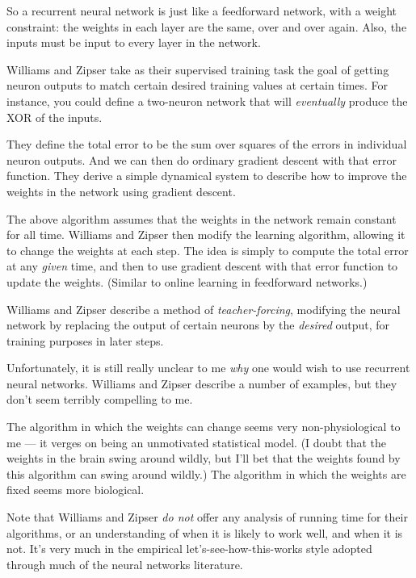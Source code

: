 \documentclass[12pt]{article}
\begin{document}
  So a recurrent neural network is just like a feedforward network,
  with a weight constraint: the weights in each layer are the same,
  over and over again.  Also, the inputs must be input to every layer
  in the network.
  
  Williams and Zipser take as their supervised training task the goal
  of getting neuron outputs to match certain desired training values
  at certain times.  For instance, you could define a two-neuron
  network that will \emph{eventually} produce the XOR of the inputs.
  
  They define the total error to be the sum over squares of the errors
  in individual neuron outputs.  And we can then do ordinary gradient
  descent with that error function.  They derive a simple dynamical
  system to describe how to improve the weights in the network using
  gradient descent.

  The above algorithm assumes that the weights in the network remain
  constant for all time.  Williams and Zipser then modify the learning
  algorithm, allowing it to change the weights at each step.  The idea
  is simply to compute the total error at any \emph{given} time, and then
  to use gradient descent with that error function to update the
  weights.  (Similar to online learning in feedforward networks.)
  
  Williams and Zipser describe a method of \emph{teacher-forcing},
  modifying the neural network by replacing the output of certain
  neurons by the \emph{desired} output, for training purposes in later
  steps.
  
  Unfortunately, it is still really unclear to me \emph{why} one would
  wish to use recurrent neural networks.  Williams and Zipser describe
  a number of examples, but they don't seem terribly compelling to me.
  
  The algorithm in which the weights can change seems very
  non-physiological to me --- it verges on being an unmotivated
  statistical model.  (I doubt that the weights in the brain swing
  around wildly, but I'll bet that the weights found by this algorithm
  can swing around wildly.)  The algorithm in which the weights are
  fixed seems more biological.
  
  Note that Williams and Zipser \emph{do not} offer any analysis of
  running time for their algorithms, or an understanding of when it is
  likely to work well, and when it is not.  It's very much in the
  empirical let's-see-how-this-works style adopted through much of the
  neural networks literature.
  
\end{document}

